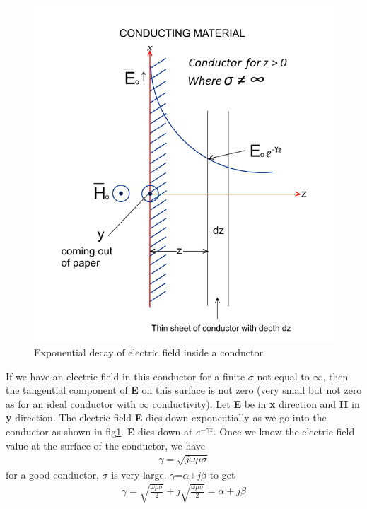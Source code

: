 \begin{figure}[h]
\centering
\includegraphics[width=0.9\linewidth]{graphics/thin_sheet_conductor}
\caption{Exponential decay of electric field inside a conductor}
\label{fig:exponential_decay_of_E_in_conductor}
\end{figure}	

If we have an electric field in this conductor for a finite $\sigma$ not equal to $\infty$, then the tangential component of \textbf{E} on this surface is not zero (very small but not zero as for an ideal conductor with $\infty$ conductivity). Let \textbf{E} be in \textbf{x} direction and \textbf{H} in \textbf{y} direction. The electric field \textbf{E} dies down exponentially as we go into the conductor as shown in fig\ref{fig:exponential_decay_of_E_in_conductor}. \textbf{E} dies down at $e^{-\gamma z}$. Once we know the electric field value at the surface of the conductor, we have
\begin{align}
\gamma=\sqrt{\textit{j}\omega\mu\sigma}
\end{align}
for a good conductor, $\sigma$ is very large. $\gamma$=$\alpha$+$j\beta$ to get
\begin{align}
\gamma=\sqrt{\frac{\omega\mu\sigma}{2}}+\textit{j}\sqrt{\frac{\omega\mu\sigma}{2}}=\alpha+\textit{j}\beta
\end{align}

